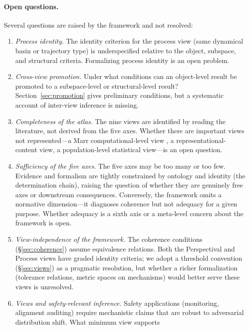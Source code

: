 \documentclass{article}
\begin{document}
\paragraph{Open questions.}
Several questions are raised by the framework and not resolved:
\begin{enumerate}[leftmargin=*]
\item \emph{Process identity.}  The identity criterion for the process
      view (same dynamical basin or trajectory type) is underspecified
      relative to the object, subspace, and structural criteria.
      Formalizing process identity is an open problem.
\item \emph{Cross-view promotion.}  Under what conditions can an
      object-level result be promoted to a subspace-level or structural-level
      result?  Section~\ref{sec:promotion} gives preliminary conditions, but
      a systematic account of inter-view inference is missing.
\item \emph{Completeness of the atlas.}  The nine views are identified
      by reading the literature, not derived from the five axes.  Whether
      there are important views not represented---a Marr computational-level
      view \citep{marr1982}, a representational-content view, a
      population-level statistical view---is an open question.
\item \emph{Sufficiency of the five axes.}  The five axes may be too many
      or too few.  Evidence and formalism are tightly constrained by
      ontology and identity (the determination chain), raising the question
      of whether they are genuinely free axes or downstream consequences.
      Conversely, the framework omits a normative dimension---it diagnoses
      coherence but not adequacy for a given purpose.  Whether adequacy
      is a sixth axis or a meta-level concern about the framework is open.
\item \emph{View-independence of the framework.}  The coherence
      conditions (\S\ref{sec:coherence}) assume equivalence
      relations.  Both the Perspectival and Process views have graded
      identity criteria; we adopt a threshold convention
      (\S\ref{sec:views}) as a pragmatic resolution, but whether a
      richer formalization (tolerance relations, metric spaces on
      mechanisms) would better serve these views is unresolved.
\item \emph{Views and safety-relevant inference.}  Safety applications
      (monitoring, alignment auditing) require mechanistic claims that are
      robust to adversarial distribution shift.  What minimum view supports

\end{enumerate}
\end{document}
